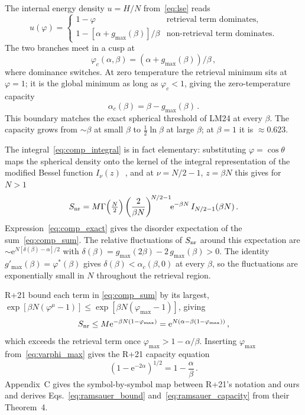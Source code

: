 \documentclass[letterpaper]{article} %
\newcommand{\e}{{\mathrm{e}}}
\newcommand{\Bnet}{\beta}
\newcommand{\ac}{\alpha_c}
\begin{document}
The internal energy density $u = H/N$ from~\eqref{eq:lse} reads
\begin{equation}
    u(\varphi) = \begin{cases}
        1 - \varphi & \text{retrieval term dominates}, \\
        1 - [\alpha + g_{\max}(\Bnet)]/\Bnet & \text{non-retrieval term dominates}.
    \end{cases}
    \label{eq:u_piecewise}
\end{equation}
The two branches meet in a cusp at
\begin{equation}
\varphi_c(\alpha, \Bnet) = (\alpha + g_{\max}(\Bnet))/\Bnet\,,
\label{eq:cusp}
\end{equation}
where dominance switches. At zero temperature the retrieval minimum sits at
$\varphi = 1$; it is the global minimum as long as $\varphi_c < 1$, giving the
zero-temperature capacity
\begin{equation}
\ac(\Bnet) = \Bnet - g_{\max}(\Bnet)\,.
\label{eq:capacity_T0}
\end{equation}
This boundary matches the exact spherical threshold of LM24 at every $\Bnet$. The capacity grows from $\sim\Bnet$ at small $\Bnet$ to $\tfrac12 \ln\Bnet$ at
large $\Bnet$; at $\Bnet = 1$ it is $\approx 0.623$.

The integral~\eqref{eq:comp_integral} is in fact elementary: substituting $\varphi = \cos\theta$ maps the spherical density onto the kernel of the integral representation of the modified Bessel function $I_\nu(z)$~\citep[8.431.3]{gradshteyn2015}, and at $\nu = N/2 - 1$, $z = \Bnet N$ this gives for $N > 1$
\begin{equation}
S_{\rm nr} = M \Gamma\Big(\tfrac{N}{2}\Big)\left(\frac{2}{\Bnet N}\right)^{\!N/2-1}\!\!\e^{-\Bnet N}\,I_{N/2-1}(\Bnet N)\,.
\label{eq:comp_exact}
\end{equation}
Expression~\eqref{eq:comp_exact} gives the disorder expectation of the sum~\eqref{eq:comp_sum}. The relative fluctuations of $S_{\rm nr}$ around this expectation are $\sim \e^{N[\delta(\Bnet) - \alpha]/2}$ with $\delta(\Bnet) = g_{\max}(2\Bnet) - 2\,g_{\max}(\Bnet) > 0$. The identity $g'_{\max}(\Bnet) = \varphi^*(\Bnet)$ gives $\delta(\Bnet) < \ac(\Bnet, 0)$ at every $\Bnet$, so the fluctuations are exponentially small in $N$ throughout the retrieval region.

R+21 bound each term in \eqref{eq:comp_sum} by its largest, $\exp[\Bnet N(\varphi^\mu - 1)] \leq \exp[\Bnet N(\varphi_{\max} - 1)]$, giving
\begin{equation}
    S_{\rm nr} \leq M\e^{-\Bnet N(1-\varphi_{\max})} = \e^{N(\alpha - \Bnet(1-\varphi_{\max}))}\,,
    \label{eq:ramsauer_bound}
\end{equation}
which exceeds the retrieval term once $\varphi_{\max} > 1 - \alpha/\Bnet$. Inserting $\varphi_{\max}$ from~\eqref{eq:varphi_max} gives the R+21 capacity equation
\begin{equation}
    (1 - \e^{-2\alpha})^{1/2} = 1 - \frac{\alpha}{\Bnet}\,.
    \label{eq:ramsauer_capacity}
\end{equation}
Appendix~C gives the symbol-by-symbol map between R+21's notation and ours and derives Eqs.~\eqref{eq:ramsauer_bound} and~\eqref{eq:ramsauer_capacity} from their Theorem~4.
\end{document}
